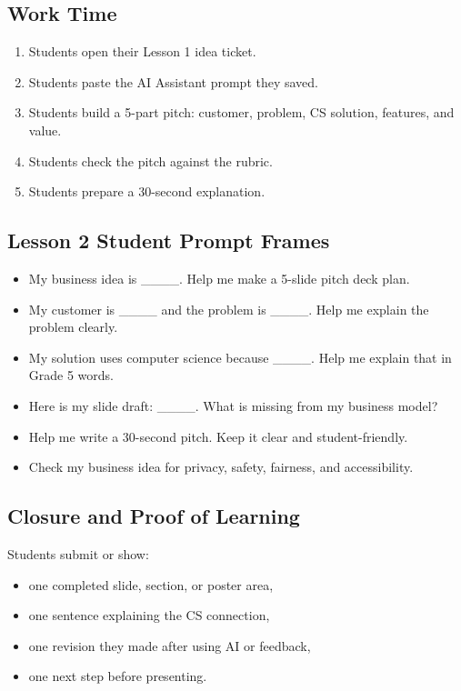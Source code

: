 \documentclass[11pt]{article}
\begin{document}
\subsection{Work Time}
\begin{enumerate}
  \item Students open their Lesson 1 idea ticket.
  \item Students paste the AI Assistant prompt they saved.
  \item Students build a 5-part pitch: customer, problem, CS solution, features, and value.
  \item Students check the pitch against the rubric.
  \item Students prepare a 30-second explanation.
\end{enumerate}

\subsection{Lesson 2 Student Prompt Frames}
\begin{itemize}
  \item My business idea is \_\_\_\_. Help me make a 5-slide pitch deck plan.
  \item My customer is \_\_\_\_ and the problem is \_\_\_\_. Help me explain the problem clearly.
  \item My solution uses computer science because \_\_\_\_. Help me explain that in Grade 5 words.
  \item Here is my slide draft: \_\_\_\_. What is missing from my business model?
  \item Help me write a 30-second pitch. Keep it clear and student-friendly.
  \item Check my business idea for privacy, safety, fairness, and accessibility.
\end{itemize}

\subsection{Closure and Proof of Learning}
Students submit or show:
\begin{itemize}
  \item one completed slide, section, or poster area,
  \item one sentence explaining the CS connection,
  \item one revision they made after using AI or feedback,
  \item one next step before presenting.
\end{itemize}
\end{document}
